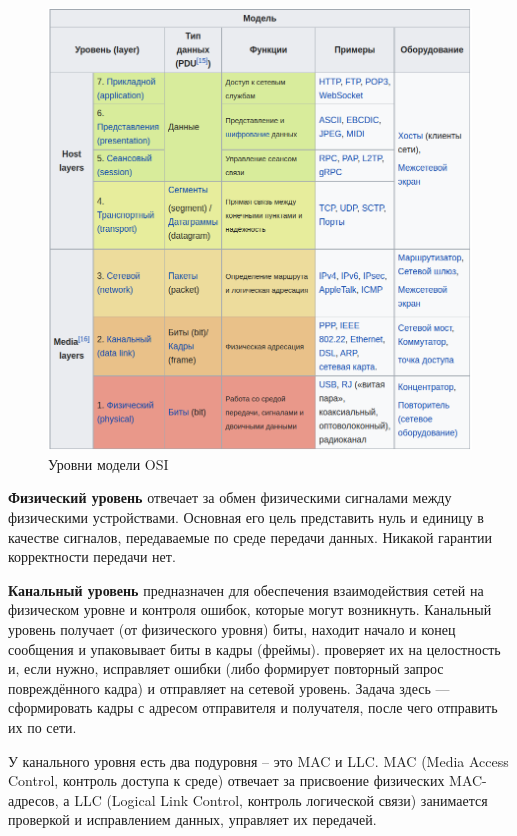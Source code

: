 \begin{figure}[H] \centering
	\includegraphics[scale = 0.6]{17/OSI.png}
	\caption{Уровни модели OSI}
\end{figure}

\textbf{Физический уровень} отвечает за обмен физическими сигналами между физическими устройствами. Основная его цель представить нуль и единицу в качестве сигналов, передаваемые по среде передачи данных. Никакой гарантии корректности передачи нет.

\textbf{Канальный уровень} предназначен для обеспечения взаимодействия сетей на физическом уровне и контроля ошибок, которые могут возникнуть. Канальный уровень получает (от физического уровня) биты, находит начало и конец сообщения и упаковывает биты в кадры (фреймы). проверяет их на целостность и, если нужно, исправляет ошибки (либо формирует повторный запрос повреждённого кадра) и отправляет на сетевой уровень. Задача здесь — сформировать кадры с адресом отправителя и получателя, после чего отправить их по сети.

У канального уровня есть два подуровня -- это MAC и LLC. MAC (Media Access Control, контроль доступа к среде) отвечает за присвоение физических MAC-адресов, а LLC (Logical Link Control, контроль логической связи) занимается проверкой и исправлением данных, управляет их передачей.

